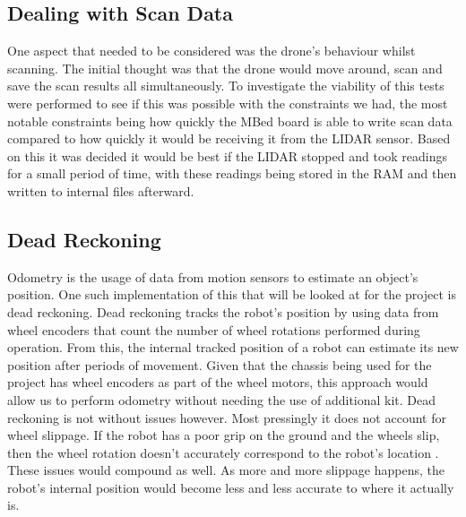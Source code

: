 			
			
			\subsection{Dealing with Scan Data}
			One aspect that needed to be considered was the drone's behaviour whilst scanning. The initial thought was that the drone would move around, scan and save the scan results all simultaneously. To investigate the viability of this tests were performed to see if this was possible with the constraints we had, the most notable constraints being how quickly the MBed board is able to write scan data compared to how quickly it would be receiving it from the LIDAR sensor. Based on this it was decided it would be best if the LIDAR stopped and took readings for a small period of time, with these readings being stored in the RAM and then written to internal files afterward. 
			
			\subsection{Dead Reckoning}
			Odometry is the usage of data from motion sensors to estimate an object's position. One such implementation of this that will be looked at for the project is dead reckoning. Dead reckoning tracks the robot's position by using data from wheel encoders that count the number of wheel rotations performed during operation. From this, the internal tracked position of a robot can estimate its new position after periods of movement. Given that the chassis being used for the project has wheel encoders as part of the wheel motors, this approach would allow us to perform odometry without needing the use of additional kit. Dead reckoning is not without issues however. Most pressingly it does not account for wheel slippage. If the robot has a poor grip on the ground and the wheels slip, then the wheel rotation doesn't accurately correspond to the robot's location \citep{choset2001topological}. These issues would compound as well. As more and more slippage happens, the robot's internal position would become less and less accurate to where it actually is. 
				
